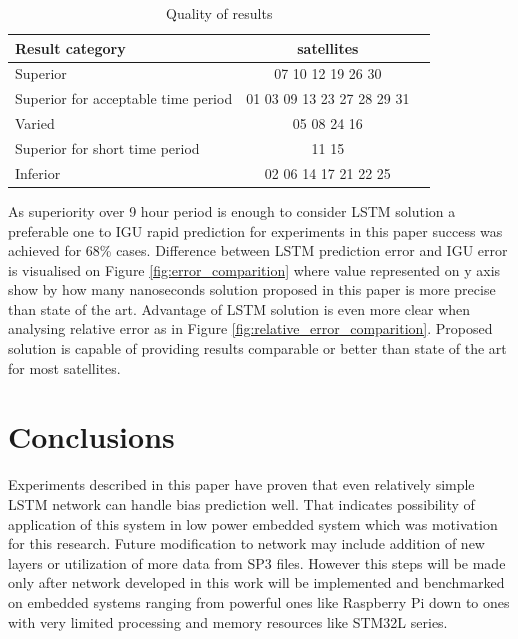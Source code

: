 \documentclass{kybernetika}
\begin{document}
\begin{table}[htb] \label{table:result}
\parindent0pt
\caption{Quality of results }
\centering
\begin{tabular}{ l  c  c }
  \hline
  \hline
  Result category & satellites\\  \hline
  Superior & 07 10 12 19 26 30\\  
  Superior for acceptable time period& 01 03 09 13 23 27 28 29 31\\ 
  Varied & 05 08 24 16\\ \hline \hline
  Superior for short time period& 11 15 \\ 
  Inferior & 02 06 14 17 21 22 25\\ 
 \end{tabular}
\end{table}

As superiority over 9 hour period is enough to consider LSTM solution a preferable one to
IGU rapid prediction for experiments in this paper success was achieved for 68\% 
cases.
Difference between LSTM prediction error and IGU error is visualised on Figure 
\ref{fig:error_comparition} where value represented on y axis show by how many nanoseconds 
solution proposed in this paper is more precise than state of the art.
Advantage of LSTM solution is even more clear when analysing relative error as in Figure
\ref{fig:relative_error_comparition}. Proposed solution is capable of providing results 
comparable or better than state of the art for most satellites.

\section{Conclusions}
Experiments described in this paper have proven that even relatively simple LSTM network can
handle bias prediction well. That indicates possibility of application of this system in 
low power embedded system which was motivation for this research. Future modification to network
may include addition of new layers or utilization of more data from SP3 files.
However this steps will be made only after network developed in this work will be implemented and
benchmarked on embedded systems ranging from powerful ones like Raspberry Pi down to ones
with very limited processing and memory resources like STM32L series.
\FloatBarrier
\makesubmdate
\end{document}

